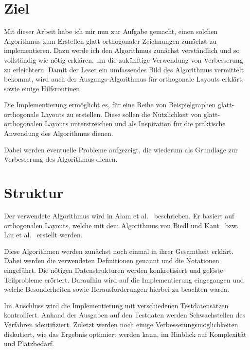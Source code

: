 \documentclass[a4paper]{scrreprt}
\theoremstyle{definition}
\newcommand{\go}{glatt-or\-tho\-go\-nal}
\begin{document}
\section{Ziel}

Mit dieser Arbeit habe ich mir nun zur Aufgabe gemacht, einen solchen Algorithmus zum Erstellen glatt-orthogonaler Zeichnungen zunächst zu implementieren. Dazu werde ich den Algorithmus zunächst verständlich und so vollständig wie nötig erklären, um die zukünftige Verwendung von Verbesserung zu erleichtern. Damit der Leser ein umfassendes Bild des Algorithmus vermittelt bekommt, wird auch der Ausgangs-Algorithmus für orthogonale Layouts erklärt, sowie einige Hilfsroutinen. 

Die Implementierung ermöglicht es, für eine Reihe von Beispielgraphen \go e Layouts zu erstellen. Diese sollen die Nützlichkeit von glatt-orthogonalen Layouts unterstreichen und als Inspiration für die praktische Anwendung des Algorithmus dienen.

Dabei werden eventuelle Probleme aufgezeigt, die wiederum als Grundlage zur Verbesserung des Algorithmus dienen. 

\section{Struktur}


Der verwendete Algorithmus wird in Alam et al.~\cite{smooth-13} beschrieben. Er basiert auf orthogonalen
Layouts, welche mit dem Algorithmus von Biedl und Kant~\cite{biedl+kant-98} bzw. Liu et al.~\cite{liu+etal-98} erstellt
werden.

Diese Algorithmen werden zunächst noch einmal in ihrer Gesamtheit erklärt. Dabei werden die
verwendeten Definitionen genannt und die Notationen eingeführt. Die nötigen Datenstrukturen
werden konkretisiert und gelöste Teilprobleme erörtert. Daraufhin wird auf die Implementierung eingegangen und welche Besonderheiten sowie Herausforderungen hierbei zu
beachten waren. 

Im Anschluss wird die Implementierung mit verschiedenen Testdatensätzen kontrolliert. Anhand
der Ausgaben auf den Testdaten werden Schwachstellen des Verfahren identifiziert. 
Zuletzt werden noch einige Verbesserungsmöglichkeiten diskutiert, wie das Ergebnis
optimiert werden kann, im Hinblick auf Komplexität und Platzbedarf.

\end{document}
